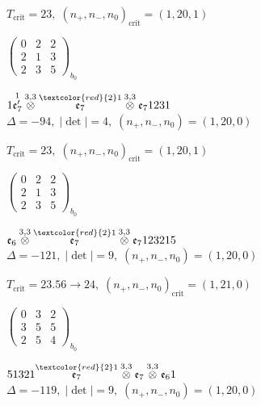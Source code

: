 \documentclass[10pt]{article}
\begin{document}
\hspace{1em}$T_{\text{crit}}=23,\; (n_+,n_-,n_0)_{\text{crit}}=(1,20,1)$

\hspace{2em}$\left(\begin{smallmatrix}0 & 2 & 2 \\ 2 & 1 & 3 \\ 2 & 3 & 5\end{smallmatrix}\right)_{\!b_0}$

\smallskip

$1\overset{1}{\mathfrak{e}_7'}\overset{3,3}{\otimes}\overset{\textcolor{red}{2}1}{\mathfrak{e}_7}\overset{3,3}{\otimes}\mathfrak{e}_71231$ \quad $\Delta=-94,\; |\det|=4,\; (n_+,n_-,n_0)=(1,20,0)$

\hspace{1em}$T_{\text{crit}}=23,\; (n_+,n_-,n_0)_{\text{crit}}=(1,20,1)$

\hspace{2em}$\left(\begin{smallmatrix}0 & 2 & 2 \\ 2 & 1 & 3 \\ 2 & 3 & 5\end{smallmatrix}\right)_{\!b_0}$

\smallskip

$\mathfrak{e}_6\overset{3,3}{\otimes}\overset{\textcolor{red}{2}1}{\mathfrak{e}_7}\overset{3,3}{\otimes}\mathfrak{e}_7123215$ \quad $\Delta=-121,\; |\det|=9,\; (n_+,n_-,n_0)=(1,20,0)$

\hspace{1em}$T_{\text{crit}}=23.56 \to 24,\; (n_+,n_-,n_0)_{\text{crit}}=(1,21,0)$

\hspace{2em}$\left(\begin{smallmatrix}0 & 3 & 2 \\ 3 & 5 & 5 \\ 2 & 5 & 4\end{smallmatrix}\right)_{\!b_0}$

\smallskip

$51321\overset{\textcolor{red}{2}1}{\mathfrak{e}_7}\overset{3,3}{\otimes}\mathfrak{e}_7\overset{3,3}{\otimes}\mathfrak{e}_61$ \quad $\Delta=-119,\; |\det|=9,\; (n_+,n_-,n_0)=(1,20,0)$
\end{document}
